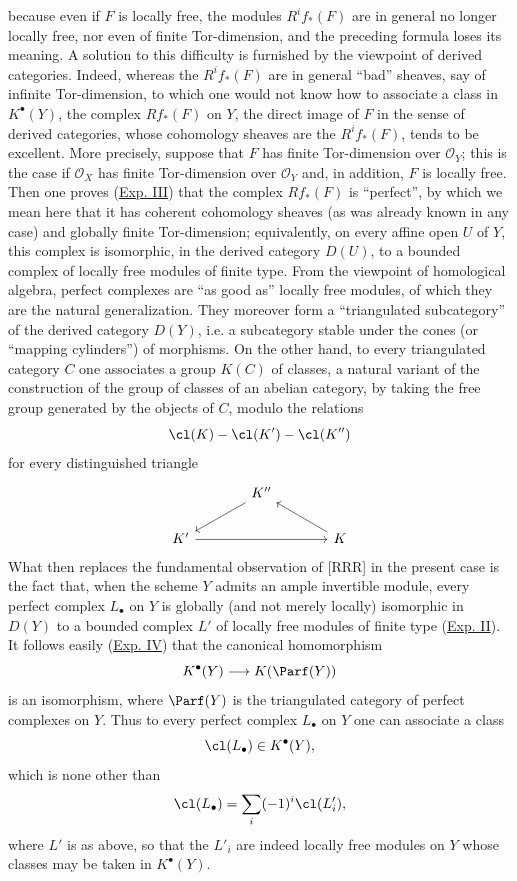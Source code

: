 because even if $F$ is locally free, the modules $R^if_*(F)$ are in general no longer locally free, nor even of finite Tor-dimension, and the preceding formula loses its meaning. A solution to this difficulty is furnished by the viewpoint of derived categories. Indeed, whereas the $R^if_*(F)$ are in general ``bad'' sheaves, say of infinite Tor-dimension, to which one would not know how to associate a class in $K^\bullet(Y)$, the complex $Rf_*(F)$ on $Y$, the direct image of $F$ in the sense of derived categories, whose cohomology sheaves are the $R^if_*(F)$, tends to be excellent. More precisely, suppose that $F$ has finite Tor-dimension over $\mathcal O_Y$; this is the case if $\mathcal O_X$ has finite Tor-dimension over $\mathcal O_Y$ and, in addition, $F$ is locally free. Then one proves (\hyperlink{sga6.e03.expose}{Exp. III}) that the complex $Rf_*(F)$ is ``perfect'', by which we mean here that it has coherent cohomology sheaves (as was already known in any case) and globally finite Tor-dimension; equivalently, on every affine open $U$ of $Y$, this complex is isomorphic, in the derived category $D(U)$, to a bounded complex of locally free modules of finite type. From the viewpoint of homological algebra, perfect complexes are ``as good as'' locally free modules, of which they are the natural generalization. They moreover form a ``triangulated subcategory'' of the derived category $D(Y)$, i.e. a subcategory stable under the cones (or ``mapping cylinders'') of morphisms. On the other hand, to every triangulated category $C$ one associates a group $K(C)$ of classes, a natural variant of the construction of the group of classes of an abelian category, by taking the free group generated by the objects of $C$, modulo the relations
\[
\cl(K)-\cl(K')-\cl(K'')
\]
for every distinguished triangle
\[
\begin{tikzcd}[column sep=large]
 & K'' \arrow[dl] & \\
K' \arrow[rr] && K \arrow[ul]
\end{tikzcd}
\]
What then replaces the fundamental observation of [RRR] in the present case is the fact that, when the scheme $Y$ admits an ample invertible module, every perfect complex $L_\bullet$ on $Y$ is globally (and not merely locally) isomorphic in $D(Y)$ to a bounded complex $L'$ of locally free modules of finite type (\hyperlink{sga6.e02.expose}{Exp. II}). It follows easily (\hyperlink{sga6.e04.expose}{Exp. IV}) that the canonical homomorphism
\[
K^\bullet(Y)\longrightarrow K(\Parf(Y))
\]
is an isomorphism, where $\Parf(Y)$ is the triangulated category of perfect complexes on $Y$. Thus to every perfect complex $L_\bullet$ on $Y$ one can associate a class
\[
\cl(L_\bullet)\in K^\bullet(Y),
\]
which is none other than
\[
\cl(L_\bullet)=\sum_i(-1)^i\cl(L'_i),
\]
where $L'$ is as above, so that the $L'_i$ are indeed locally free modules on $Y$ whose classes may be taken in $K^\bullet(Y)$.

